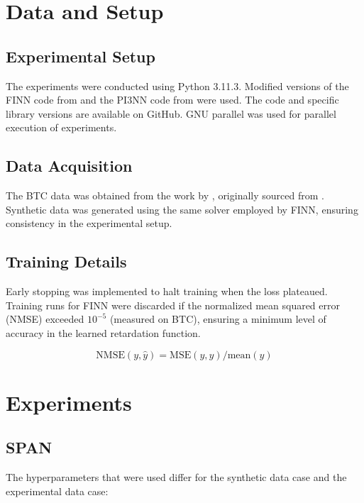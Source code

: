 \documentclass{article}
\begin{document}
\section{Data and Setup}

\subsection{Experimental Setup}
The experiments were conducted using Python 3.11.3. Modified versions of the FINN code from \textcite{finn} and the PI3NN code from \textcite{pi3nn} were used. The code and specific library versions are available on GitHub. GNU parallel \cite{tange_2023_10199085} was used for parallel execution of experiments. %

\subsection{Data Acquisition}
The BTC data was obtained from the work by \textcite{finn}, originally sourced from \textcite{nowak2016entropy}. Synthetic data was generated using the same solver employed by FINN, ensuring consistency in the experimental setup.

\subsection{Training Details}
Early stopping was implemented to halt training when the loss plateaued. Training runs for FINN were discarded if the normalized mean squared error (NMSE) exceeded $10^{-5}$ (measured on BTC), ensuring a minimum level of accuracy in the learned retardation function.

\begin{equation*}
    \text{NMSE}(y, \hat{y}) = \text{MSE}(y, \hat{y}) / \text{mean}(y)
\end{equation*}




\section{Experiments}

\subsection{SPAN}
The hyperparameters that were used differ for the synthetic data case and the experimental data case:
\end{document}

